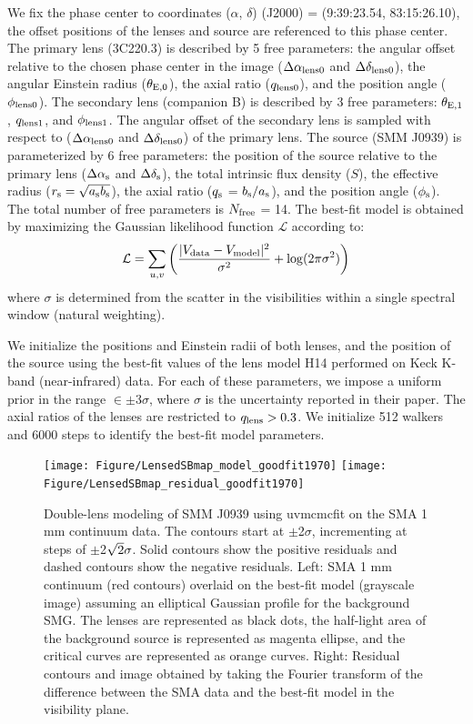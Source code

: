 \documentclass[twocolumn,apj,numberedappendix]{emulateapj}
\begin{document}
We fix the phase center to coordinates ($\alpha$, $\delta$) (J2000) = (9:39:23.54, 83:15:26.10), the
offset positions of the lenses and source are referenced to this phase center. The primary lens (3C220.3) is
described by 5 free parameters: the angular offset relative to
the chosen phase center in the image ($\Delta \alpha_{\rm
lens0}$ and $\Delta \delta_{\rm lens0}$), the angular Einstein radius ($\theta_{\rm E,0}$), the
axial ratio ($q_{\rm lens0}$), and the position angle ($\phi_{\rm lens0}$). The secondary lens (companion B) is
described by 3 free parameters: $\theta_{\rm E,1}$, $q_{\rm lens1}$, and $\phi_{\rm lens1}$. The angular offset
of the secondary
lens is sampled with respect to ($\Delta \alpha_{\rm lens0}$ and $\Delta \delta_{\rm lens0}$) of
the primary lens.
The source (SMM J0939) is parameterized by
6 free parameters: the position of the source relative to the
primary lens ($\Delta \alpha_{\rm s}$ and $\Delta
\delta_{\rm s}$), the total intrinsic flux density ($S$), the
effective radius ($r_{\rm s} = \sqrt{a_{\rm s} b_{\rm s}}$), the axial
ratio ($q_{\rm s}$ =  $b_{\rm s}/a_{\rm s}$), and the position angle
($\phi_{\rm s}$).
The total number of free parameters is $N_{\rm free}$ = 14. The best-fit model is obtained by maximizing the
Gaussian likelihood function $ \mathcal{L} $ according to:
\begin{equation}
    \mathcal{L} = \sum_{u, v}\left( \frac{|V_{\rm data} - V_{\rm
    model}|^2}{\sigma^2} + {\rm log}(2 \pi \sigma^2) \right)
\end{equation}
\noindent where $\sigma$ is determined from the scatter in the visibilities within a
single spectral window (natural weighting).

We initialize the positions and Einstein radii of both lenses, and the position of the source using the
best-fit values of the lens model H14 performed on Keck K-band (near-infrared) data. For each of
these parameters, we impose a uniform prior in the range $\in\pm$3$\sigma$, where $\sigma$ is the uncertainty
reported in their paper. The axial ratios of the lenses are restricted to $q_{\rm lens} > 0.3$. We initialize 512
walkers and 6000 steps to identify the best-fit model parameters.
\begin{figure}[!tbpH]
\centering
\texttt{[image: Figure/LensedSBmap\_model\_goodfit1970]}
\texttt{[image: Figure/LensedSBmap\_residual\_goodfit1970]}
\caption{Double-lens modeling of SMM J0939 using {\sc uvmcmcfit} on the SMA 1 mm continuum data.
The contours start at $\pm$2$\sigma$, incrementing at
steps of $\pm$2$\sqrt{\rm 2}\sigma$. Solid contours show the positive residuals and dashed contours
show the negative residuals. 
Left: SMA 1 mm continuum (red contours) overlaid on the best-fit model (grayscale image) assuming an elliptical Gaussian profile for the background SMG. The lenses are represented as black dots, the half-light area of the background source is represented as magenta ellipse, and the critical curves are represented as orange curves. 
Right: Residual contours and image obtained by taking the Fourier transform of the difference between the SMA data and the best-fit model in the visibility plane. \label{fig:lens}}
\end{figure}
\end{document}
